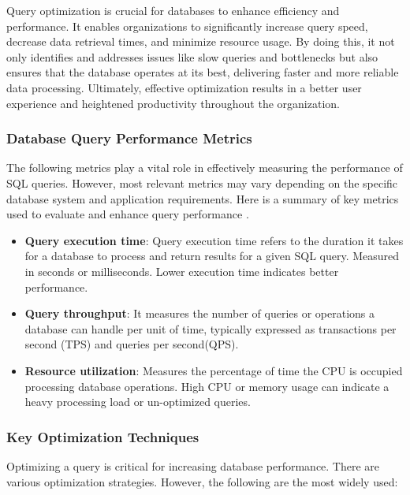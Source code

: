Query optimization is crucial for databases to enhance efficiency and performance. It enables organizations to significantly increase query speed, decrease data retrieval times, and minimize resource usage. By doing this, it not only identifies and addresses issues like slow queries and bottlenecks but also ensures that the database operates at its best, delivering faster and more reliable data processing. Ultimately, effective optimization results in a better user experience and heightened productivity throughout the organization\cite{team-2023, r-2024}.


\subsubsection{Database Query Performance Metrics}
The following metrics play a vital role in effectively measuring the performance of SQL queries. However, most relevant metrics may vary depending on the specific database system and application requirements.
Here is a summary of key metrics used to evaluate and enhance query performance \cite{chwesewicz-2024}.
\begin{itemize}
    \item\textbf{Query execution time}: Query execution time refers to the duration it takes for a database to process and return results for a given SQL query. Measured in seconds or milliseconds. Lower execution time indicates better performance.
    \item\textbf{Query throughput}: It measures the number of queries or operations a database can handle per unit of time, typically expressed as transactions per second (TPS) and queries per second(QPS).
    \item\textbf{Resource utilization}: Measures the percentage of time the CPU is occupied processing database operations. High CPU or memory usage can indicate a heavy processing load or un-optimized queries.
\end{itemize}

\subsubsection{Key Optimization Techniques}

Optimizing a query is critical for increasing database performance. There are various optimization strategies. However, the following are the most widely used:

